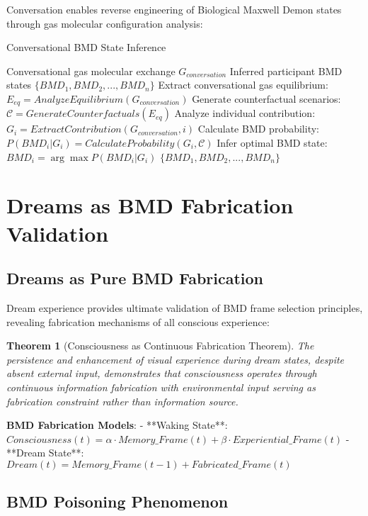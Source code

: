 \documentclass[12pt,a4paper]{article}
\newtheorem{theorem}{Theorem}
\begin{document}
Conversation enables reverse engineering of Biological Maxwell Demon states through gas molecular configuration analysis:

\begin{algorithm}[H]
\caption{Conversational BMD State Inference}
\begin{algorithmic}[1]
\REQUIRE Conversational gas molecular exchange $G_{conversation}$
\ENSURE Inferred participant BMD states $\{BMD_1, BMD_2, ..., BMD_n\}$
\STATE Extract conversational gas equilibrium: $E_{eq} = AnalyzeEquilibrium(G_{conversation})$
\STATE Generate counterfactual scenarios: $\mathcal{C} = GenerateCounterfactuals(E_{eq})$
    \STATE Analyze individual contribution: $G_i = ExtractContribution(G_{conversation}, i)$
    \STATE Calculate BMD probability: $P(BMD_i | G_i) = CalculateProbability(G_i, \mathcal{C})$
    \STATE Infer optimal BMD state: $BMD_i = \arg\max P(BMD_i | G_i)$
\ENDFOR
\RETURN $\{BMD_1, BMD_2, ..., BMD_n\}$
\end{algorithmic}
\end{algorithm}

\section{Dreams as BMD Fabrication Validation}

\subsection{Dreams as Pure BMD Fabrication}

Dream experience provides ultimate validation of BMD frame selection principles, revealing fabrication mechanisms of all conscious experience:

\begin{theorem}[Consciousness as Continuous Fabrication Theorem]
The persistence and enhancement of visual experience during dream states, despite absent external input, demonstrates that consciousness operates through continuous information fabrication with environmental input serving as fabrication constraint rather than information source.
\end{theorem}

\textbf{BMD Fabrication Models}:
- **Waking State**: $Consciousness(t) = \alpha \cdot Memory\_Frame(t) + \beta \cdot Experiential\_Frame(t)$
- **Dream State**: $Dream(t) = Memory\_Frame(t-1) + Fabricated\_Frame(t)$

\subsection{BMD Poisoning Phenomenon}
\end{document}
